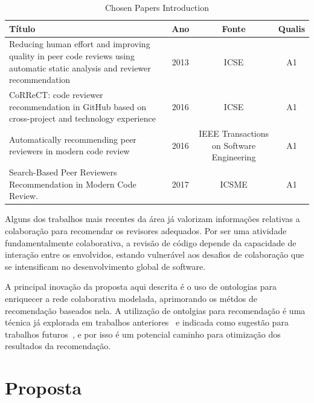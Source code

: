 \documentclass[a4paper,12pt]{monografia}
\theoremstyle{plain}
\theoremstyle{definition}
\theoremstyle{remark}
\begin{document}
\begin{table}[!h]
\centering
\begin{tabularx}{\columnwidth}{|X|c|c|c|}
\toprule
\hline
Título                                                                                                                        & Ano & Fonte                               & Qualis &  \\
\hline
Reducing human effort and improving quality in peer code reviews using automatic static analysis and reviewer recommendation & 2013 & ICSE                                      & A1            &  \\
CoRReCT: code reviewer recommendation in GitHub based on cross-project and technology experience                             & 2016 & ICSE                                      & A1            &  \\
Automatically recommending peer reviewers in modern code review                                                              & 2016 & IEEE Transactions on Software Engineering & A1            &  \\
Search-Based Peer Reviewers Recommendation in Modern Code Review.                                                            & 2017 & ICSME                                  & A1            &  \\ \bottomrule
\hline

\end{tabularx}%
\caption{Chosen Papers Introduction}
\label{tab:presentation}
\end{table}

Alguns dos trabalhos mais recentes da área já valorizam informações relativas a colaboração para recomendar os revisores adequados\cite{ouni2016, zanjani2016}. Por ser uma atividade fundamentalmente colaborativa, a revisão de código depende da capacidade de interação entre os envolvidos, estando vulnerável aos desafios de colaboração que se intensificam no desenvolvimento global de software.

A principal inovação da proposta aqui descrita é o uso de ontologias para enriquecer a rede colaborativa modelada, aprimorando os métdos de recomendação baseados nela. A utilização de ontolgias para recomendação é uma técnica já explorada em trabalhos anteriores~\cite{middleton2001,middleton2004} e indicada como sugestão para trabalhos futuros~\cite{adomavicius2005}, e por isso é um potencial caminho para otimização dos resultados da recomendação.

\chapter{Proposta}\label{cha:proposta}
\end{document}

